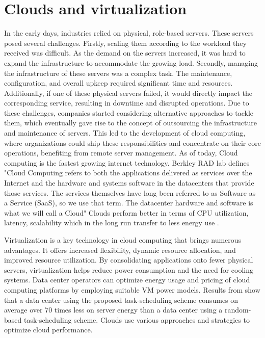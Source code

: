 \documentclass[
  a4paper,  %
  twoside,  %
  bibliography=totoc,
  headsepline,
  cleardoublepage=empty,
  parskip=half,
  draft=false
]{scrbook}
\begin{document}

\chapter{Clouds and virtualization}

In the early days, industries relied on physical, role-based servers. These servers posed several challenges. Firstly, scaling them according to the workload they received was difficult. As the demand on the servers increased, it was hard to expand the infrastructure to accommodate the growing load. Secondly, managing the infrastructure of these servers was a complex task. The maintenance, configuration, and overall upkeep required significant time and resources. Additionally, if one of these physical servers failed, it would directly impact the corresponding service, resulting in downtime and disrupted operations. Due to these challenges, companies started considering alternative approaches to tackle them, which eventually gave rise to the concept of outsourcing the infrastructure and maintenance of servers. This led to the development of cloud computing, where organizations could ship these responsibilities and concentrate on their core operations, benefiting from remote server management. As of today, Cloud computing is the fastest growing internet technology\cite{anand2021need}. Berkley RAD lab defines "Cloud Computing refers to both the applications delivered as services over the Internet and the hardware and systems software in the datacenters that provide those services. The services themselves have long been referred to as Software as a Service (SaaS), so we use that term. The datacenter hardware and software is what we will call a Cloud"\cite{fox2009above}
Clouds perform better in terms of CPU utilization, latency, scalability which in the long run transfer to less energy use \cite{khanghahi2013cloud}. 

Virtualization is a key technology in cloud computing that brings numerous advantages. It offers increased flexibility, dynamic resource allocation, and improved resource utilization. By consolidating applications onto fewer physical servers, virtualization helps reduce power consumption and the need for cooling systems. Data center operators can optimize energy usage and pricing of cloud computing platforms by employing suitable VM power models. Results from \cite{6679892} show that a data center using the proposed task-scheduling scheme consumes on average over 70 times less on server energy than a data center using a random-based task-scheduling scheme. Clouds use various approaches and strategies to optimize cloud performance\cite{alzakholi2020comparison}.
\end{document}
